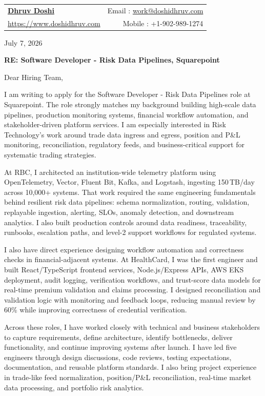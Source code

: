 \documentclass[letterpaper, 11pt]{article}
\begin{document}
\begin{tabular*}{\textwidth}{l@{\extracolsep{\fill}}r}
    \textbf{\href{http://doshidhruv.com/}{\Large Dhruv Doshi}} & Email : \href{mailto:work@doshidhruv.com}{work@doshidhruv.com} \\
    \href{https://doshidhruv.com/}{https://www.doshidhruv.com} & Mobile : +1-902-989-1274 \\
\end{tabular*}

\hrulefill

\bigbreak
July 7, 2026

\bigbreak
\centerline{\large\textbf{RE: Software Developer - Risk Data Pipelines, Squarepoint}}

\bigbreak
Dear Hiring Team,

\bigbreak
I am writing to apply for the Software Developer - Risk Data Pipelines role at Squarepoint. The role strongly matches my background building high-scale data pipelines, production monitoring systems, financial workflow automation, and stakeholder-driven platform services. I am especially interested in Risk Technology's work around trade data ingress and egress, position and P\&L monitoring, reconciliation, regulatory feeds, and business-critical support for systematic trading strategies.

\bigbreak
At RBC, I architected an institution-wide telemetry platform using OpenTelemetry, Vector, Fluent Bit, Kafka, and Logstash, ingesting 150\,TB/day across 10,000+ systems. That work required the same engineering fundamentals behind resilient risk data pipelines: schema normalization, routing, validation, replayable ingestion, alerting, SLOs, anomaly detection, and downstream analytics. I also built production controls around data readiness, traceability, runbooks, escalation paths, and level-2 support workflows for regulated systems.

\bigbreak
I also have direct experience designing workflow automation and correctness checks in financial-adjacent systems. At HealthCard, I was the first engineer and built React/TypeScript frontend services, Node.js/Express APIs, AWS EKS deployment, audit logging, verification workflows, and trust-score data models for real-time premium validation and claims processing. I designed reconciliation and validation logic with monitoring and feedback loops, reducing manual review by 60\% while improving correctness of credential verification.

\bigbreak
Across these roles, I have worked closely with technical and business stakeholders to capture requirements, define architecture, identify bottlenecks, deliver functionality, and continue improving systems after launch. I have led five engineers through design discussions, code reviews, testing expectations, documentation, and reusable platform standards. I also bring project experience in trade-like feed normalization, position/P\&L reconciliation, real-time market data processing, and portfolio risk analytics.
\end{document}
